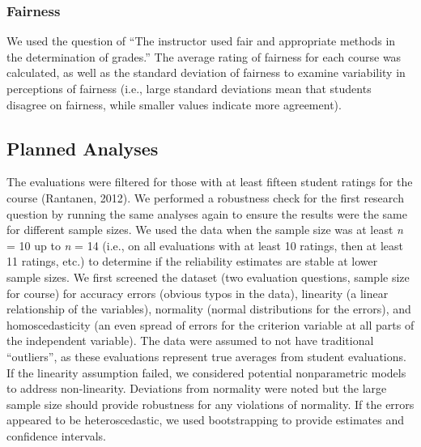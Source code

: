 \documentclass[
  man]{apa7}
\begin{document}
\subsubsection{Fairness}\label{fairness}

We used the question of ``The instructor used fair and appropriate methods in the determination of grades.'' The average rating of fairness for each course was calculated, as well as the standard deviation of fairness to examine variability in perceptions of fairness (i.e., large standard deviations mean that students disagree on fairness, while smaller values indicate more agreement).

\subsection{Planned Analyses}\label{planned-analyses}

The evaluations were filtered for those with at least fifteen student
ratings for the course (Rantanen, 2012). We performed a robustness check
for the first research question by running the same analyses again to
ensure the results were the same for different sample sizes. We used the
data when the sample size was at least \emph{n} = 10 up to \emph{n} = 14 (i.e., on
all evaluations with at least 10 ratings, then at least 11 ratings,
etc.) to determine if the reliability estimates are stable at lower
sample sizes. We first screened the dataset (two evaluation questions,
sample size for course) for accuracy errors (obvious typos in the data),
linearity (a linear relationship of the variables), normality (normal
distributions for the errors), and homoscedasticity (an even spread of
errors for the criterion variable at all parts of the independent
variable). The data were assumed to not have traditional ``outliers'', as
these evaluations represent true averages from student evaluations. If
the linearity assumption failed, we considered potential nonparametric
models to address non-linearity. Deviations from normality were noted
but the large sample size should provide robustness for any violations
of normality. If the errors appeared to be heteroscedastic, we used
bootstrapping to provide estimates and confidence intervals.
\end{document}
